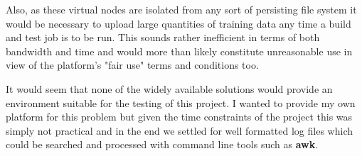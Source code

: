 Also, as these virtual nodes are isolated from any sort of persisting file
system it would be necessary to upload large quantities of training data any
time a build and test job is to be run. This sounds rather inefficient in terms
of both bandwidth and time and would more than likely constitute unreasonable
use in view of the platform's "fair use" terms and conditions too.

It would seem that none of the widely available solutions would provide an
environment suitable for the testing of this project. I wanted to provide my
own platform for this problem but given the time constraints of the project this
was simply not practical and in the end we settled for well formatted log files
which could be searched and processed with command line tools such as
\textbf{awk}.



